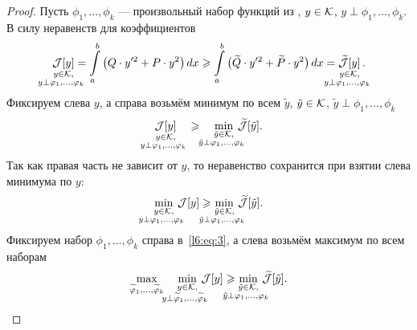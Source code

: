 \begin{proof}
	Пусть $\phi_1,\ldots,\phi_k$ --- произвольный набор функций из \fL, $y\in\mathcal{K}$, $y\perp\phi_1,\ldots,\phi_k$. В силу неравенств для коэффициентов 
	\begin{equation}
		\label{l6:eq:1}
		\hfill \mathop{\J[y]}\limits_{\substack{y\in\K,\\\lefteqn{\scriptstyle \hspace*{-0.8cm}y\perp\phi_1,\ldots,\phi_{k}}}}=\int\limits_a^b\big(Q\cdot y'^2+P\cdot y^2\big)\,dx\geqslant\int\limits_a^b\big(\widetilde{Q}\cdot y'^2+\widetilde{P}\cdot y^2\big)\,dx=\mathop{\widetilde{\J}[y]}\limits_{\substack{y\in\K,\\\lefteqn{\scriptstyle \hspace*{-0.8cm}y\perp\phi_1,\ldots,\phi_{k}}}}.\hfill
	\end{equation}
	Фиксируем слева $y$, а справа возьмём минимум по всем $\tilde{y}$, $\tilde{y}\in\mathcal{K}$, $\tilde{y}\perp \phi_1,\ldots,\phi_k$
	\begin{equation}
		\label{l6:eq:2}
		\hfill\mathop{\J[y]}\limits_{\substack{y\in\K,\\\lefteqn{\scriptstyle \hspace*{-0.8cm}y\perp\phi_1,\ldots,\phi_{k}}}}\quad\geqslant\quad\min\limits_{\substack{\tilde{y}\in\K,\\\lefteqn{\scriptstyle \hspace*{-0.8cm}\tilde{y}\perp\phi_1,\ldots,\phi_{k}}}}\,\widetilde{\J}[\tilde{y}].\hfill
	\end{equation}
	Так как правая часть не зависит от $y$, то неравенство сохранится при взятии слева минимума по $y$:
	\begin{equation}
		\label{l6:eq:3}
		\hfill\min\limits_{\substack{y\in\K,\\\lefteqn{\scriptstyle \hspace*{-0.8cm}y\perp\phi_1,\ldots,\phi_{k}}}}\,\J[y]\geqslant\min\limits_{\substack{\tilde{y}\in\K,\\\lefteqn{\scriptstyle \hspace*{-0.8cm}\tilde{y}\perp\phi_1,\ldots,\phi_{k}}}}\,\widetilde{\J}[\tilde{y}].\hfill
	\end{equation}
	Фиксируем набор $\phi_1,\ldots,\phi_k$ справа в~\eqref{l6:eq:3}, а слева возьмём максимум по всем наборам
	\begin{equation}
		\label{l6:eq:4}
		\hfill\max\limits_{\widetilde{\phi}_1,\ldots,\widetilde{\phi}_k}\quad\min\limits_{\substack{y\in\K,\\\lefteqn{\scriptstyle \hspace*{-0.8cm}y\perp\widetilde{\phi}_1,\ldots,\widetilde{\phi}_{k}}}}\,\J[y]\geqslant\min\limits_{\substack{\tilde{y}\in\K,\\\lefteqn{\scriptstyle \hspace*{-0.8cm}\tilde{y}\perp\phi_1,\ldots,\phi_{k}}}}\,\widetilde{\J}[\tilde{y}].\hfill

\end{equation}
\end{proof}
